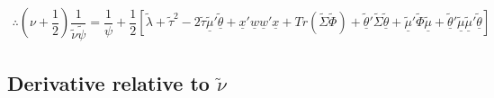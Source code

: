 \documentclass[fleqn]{minimal}
\begin{document}
\begin{align*}
  \therefore
  \left(
    \nu
    +\dfrac{1}{2}
  \right)
  \dfrac{1}{\tilde{\nu}\tilde{\psi}}
  =
  \dfrac{1}{\psi}
  + \dfrac{1}{2}
  \left[
    \tilde{\lambda} + \tilde{\tau}^2
    - 2\tilde{\tau}\underline{\tilde{\mu}}'\underline{\tilde{\theta}}
    + \underline{x}'\underline{w}\underline{w}'\underline{x}
    + Tr \left( \tilde{\Sigma}\tilde{\Phi}\right)
    + \underline{\tilde{\theta}}'\tilde{\Sigma}\underline{\tilde{\theta}}
    + \underline{\tilde{\mu}}'\tilde{\Phi}\underline{\tilde{\mu}}
    + \underline{\tilde{\theta}}'\underline{\tilde{\mu}}\underline{\tilde{\mu}}'\underline{\tilde{\theta}}
  \right]
\end{align*}

\subsection{Derivative relative to $\tilde{\nu}$}
\end{document}
